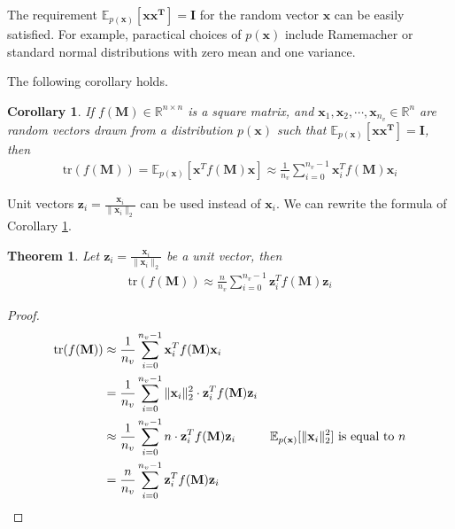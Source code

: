 \documentclass[senior,final,11pt]{iscs-thesis}
\newtheorem{theorem}{Theorem}
\newtheorem{corollary}{Corollary}[theorem]
\begin{document}
The requirement $\mathbb{E}_{p(\mathbf{x})}[\mathbf{xx^T}] = \mathbf{I}$ for the random vector  $\mathbf{x}$ can be easily satisfied. For example, paractical choices of $p(\mathbf{x})$ include Ramemacher or standard normal distributions with zero mean and one variance.

The following corollary holds.

\begin{corollary}
    \label{approxtrace}
    If $f(\mathbf{M}) \in \mathbb{R}^{n\times n}$ is a square matrix, and $\mathbf{x}_1, \mathbf{x}_2, \cdots, \mathbf{x}_{n_v} \in \mathbb{R}^n$ are random vectors drawn from a distribution $p(\mathbf{x})$ such that $\mathbb{E}_{p(\mathbf{x})}[\mathbf{xx^T}] = \mathbf{I}$, then
    \begin{align*}
        \mathrm{tr}(f(\mathbf{M})) =\mathbb{E}_{p(\mathbf{x})}[\mathbf{x}^{T}f(\mathbf{M})\mathbf{x}] \approx \frac{1}{n_v}\sum_{i=0}^{n_v-1} \mathbf{x}_i^{T}f(\mathbf{M})\mathbf{x}_i
    \end{align*}
\end{corollary}

Unit vectors $\mathbf{z}_i = \frac{\mathbf{x}_i}{\|\mathbf{x}_i\|_2}$ can be used instead of $\mathbf{x}_i$. We can rewrite the formula of Corollary \ref{approxtrace}.
\begin{theorem}
    \label{approxtraceUniformed}
    Let $\mathbf{z}_i = \frac{\mathbf{x}_i}{\|\mathbf{x}_i\|_2}$ be a unit vector, then
    \begin{align*}
        \mathrm{tr}(f(\mathbf{M})) \approx \frac{n}{n_v}\sum_{i=0}^{n_v-1} \mathbf{z}_i^{T}f(\mathbf{M})\mathbf{z}_i
    \end{align*}
\end{theorem}
\begin{proof}
    \begin{align*}
        \mathrm{tr}(f(\mathbf{M})) &\approx \frac{1}{n_v}\sum_{i=0}^{n_v-1} \mathbf{x}_i^{T}f(\mathbf{M})\mathbf{x}_i \\
        &= \frac{1}{n_v}\sum_{i=0}^{n_v-1} \|\mathbf{x}_i\|_2^2 \cdot \mathbf{z}_i^{T}f(\mathbf{M})\mathbf{z}_i \\
        &\approx \frac{1}{n_v}\sum_{i=0}^{n_v-1} n \cdot \mathbf{z}_i^{T}f(\mathbf{M})\mathbf{z}_i &\text{$ \mathbb{E}_{p(\mathbf{x})}[\|\mathbf{x}_i\|_2^2$]  is equal to $n$}\\
        &= \frac{n}{n_v}\sum_{i=0}^{n_v-1} \mathbf{z}_i^{T}f(\mathbf{M})\mathbf{z}_i
    \end{align*}
\end{proof}
\end{document}
